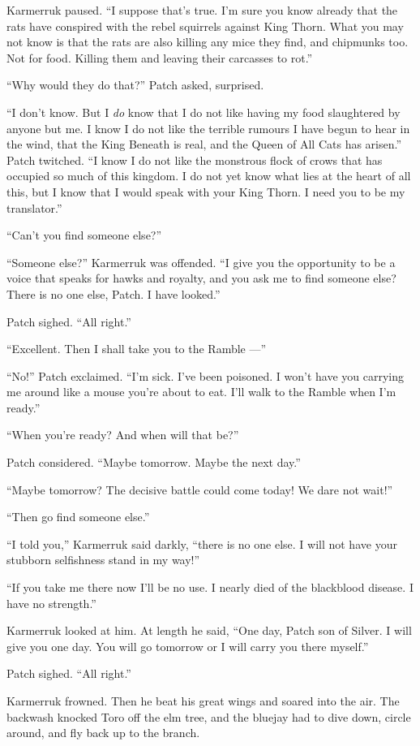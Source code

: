 \documentclass[ebook,oneside,openany,17pt]{memoir}
\begin{document}
Karmerruk paused. “I suppose that’s true. I’m sure you know already
that the rats have conspired with the rebel squirrels against King
Thorn. What you may not know is that the rats are also killing any
mice they find, and chipmunks too. Not for food. Killing them and
leaving their carcasses to rot.”

“Why would they do that?” Patch asked, surprised.

“I don’t know. But I \emph{do} know that I do not like having my
food slaughtered by anyone but me. I know I do not like the terrible
rumours I have begun to hear in the wind, that the King Beneath is
real, and the Queen of All Cats has arisen.” Patch twitched. “I know I
do not like the monstrous flock of crows that has occupied so much of
this kingdom. I do not yet know what lies at the heart of all this,
but I know that I would speak with your King Thorn. I need you to be
my translator.”

“Can’t you find someone else?”

“Someone else?” Karmerruk was offended. “I give you the opportunity to
be a voice that speaks for hawks and royalty, and you ask me to find
someone else? There is no one else, Patch. I have looked.”

Patch sighed. “All right.”

“Excellent. Then I shall take you to the Ramble —”

“No!” Patch exclaimed. “I’m sick. I’ve been poisoned. I won’t have you
carrying me around like a mouse you’re about to eat. I’ll walk to the
Ramble when I’m ready.”

“When you’re ready? And when will that be?”

Patch considered. “Maybe tomorrow. Maybe the next day.”

“Maybe tomorrow? The decisive battle could come today! We dare not
wait!”

“Then go find someone else.”

“I told you,” Karmerruk said darkly, “there is no one else. I will not
have your stubborn selfishness stand in my way!”

“If you take me there now I’ll be no use. I nearly died of the
blackblood disease. I have no strength.”

Karmerruk looked at him. At length he said, “One day, Patch son of
Silver. I will give you one day. You will go tomorrow or I will carry
you there myself.”

Patch sighed. “All right.”

Karmerruk frowned. Then he beat his great wings and soared into the
air. The backwash knocked Toro off the elm tree, and the bluejay had
to dive down, circle around, and fly back up to the branch.
\end{document}
